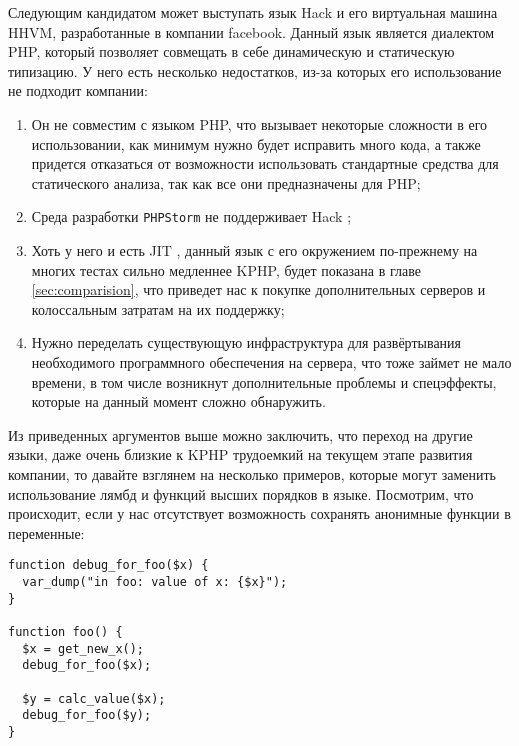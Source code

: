 Следующим кандидатом может выступать язык Hack и его виртуальная машина HHVM, разработанные в компании facebook.
Данный язык является диалектом PHP, который позволяет совмещать в себе динамическую и статическую типизацию.
У него есть несколько недостатков, из-за которых его использование не подходит компании:

\begin{enumerate}
\item Он не совместим с языком PHP, что вызывает некоторые сложности в его использовании, как минимум нужно будет исправить много кода, а также придется отказаться от возможности использовать стандартные средства для статического анализа, так как все они предназначены для PHP;

\item Среда разработки \verb|PHPStorm| не поддерживает Hack \cite{hack-postponed};

\item Хоть у него и есть JIT \cite{hack-jit}, данный язык с его окружением по-прежнему на многих тестах сильно медленнее KPHP, будет показана в главе \ref{sec:comparision}, что приведет нас к покупке дополнительных серверов и колоссальным затратам на их поддержку;

\item Нужно переделать существующую инфраструктура для развёртывания необходимого программного обеспечения на сервера, что тоже займет не мало времени, в том числе возникнут дополнительные проблемы и спецэффекты, которые на данный момент сложно обнаружить.
\end{enumerate}

Из приведенных аргументов выше можно заключить, что переход на другие языки, даже очень близкие к KPHP трудоемкий на текущем этапе развития компании, то давайте взглянем на несколько примеров, которые могут заменить использование лямбд и функций высших порядков в языке.
Посмотрим, что происходит, если у нас отсутствует возможность сохранять анонимные функции в переменные:
\begin{lstlisting}[caption={Пример кода без анонимных функций},label={without_lambda}]
function debug_for_foo($x) {
  var_dump("in foo: value of x: {$x}");
}

function foo() {
  $x = get_new_x();
  debug_for_foo($x);

  $y = calc_value($x);
  debug_for_foo($y);
}
\end{lstlisting}

